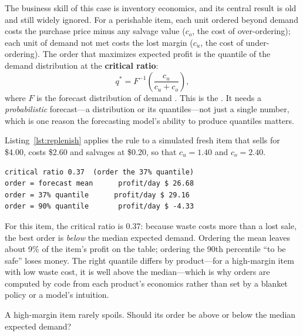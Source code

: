 The business skill of this case is inventory economics, and its central result is old and still widely ignored. For a perishable item, each unit ordered beyond demand costs the purchase price minus any salvage value ($c_o$, the cost of over-ordering); each unit of demand not met costs the lost margin ($c_u$, the cost of under-ordering). The order that maximizes expected profit is the quantile of the demand distribution at the \textbf{critical ratio}:
\begin{equation}
  q^\ast = F^{-1}\!\left(\frac{c_u}{c_u + c_o}\right),
  \label{eq:newsvendor}
\end{equation}
where $F$ is the forecast distribution of demand \citep{silver2017inventory}. This is the . It needs a \emph{probabilistic} forecast---a distribution or its quantiles---not just a single number, which is one reason the forecasting model's ability to produce quantiles matters.

Listing~\ref{lst:replenish} applies the rule to a simulated fresh item that sells for \$4.00, costs \$2.60 and salvages at \$0.20, so that $c_u = 1.40$ and $c_o = 2.40$.



\begin{lstlisting}[language={}, numbers=none, frame=none, xleftmargin=1.5em]
critical ratio 0.37  (order the 37% quantile)
order = forecast mean      profit/day $ 26.68
order = 37% quantile      profit/day $ 29.16
order = 90% quantile       profit/day $ -4.33
\end{lstlisting}

For this item, the critical ratio is 0.37: because waste costs more than a lost sale, the best order is \emph{below} the median expected demand. Ordering the mean leaves about 9\% of the item's profit on the table; ordering the 90th percentile ``to be safe'' loses money. The right quantile differs by product---for a high-margin item with low waste cost, it is well above the median---which is why orders are computed by code from each product's economics rather than set by a blanket policy or a model's intuition.

\begin{quickcheck}
A high-margin item rarely spoils. Should its order be above or below the median expected demand?
\end{quickcheck}

